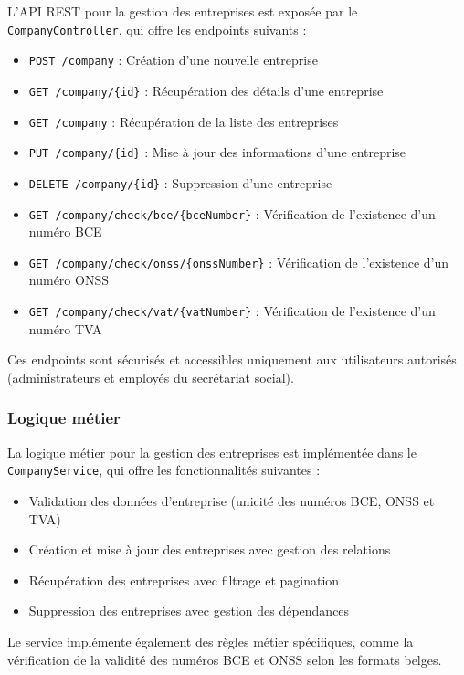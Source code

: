 \documentclass[12pt,a4paper]{report}
\begin{document}
L'API REST pour la gestion des entreprises est exposée par le \texttt{CompanyController}, qui offre les endpoints suivants :

\begin{itemize}
  \item \texttt{POST /company} : Création d'une nouvelle entreprise
  \item \texttt{GET /company/\{id\}} : Récupération des détails d'une entreprise
  \item \texttt{GET /company} : Récupération de la liste des entreprises
  \item \texttt{PUT /company/\{id\}} : Mise à jour des informations d'une entreprise
  \item \texttt{DELETE /company/\{id\}} : Suppression d'une entreprise
  \item \texttt{GET /company/check/bce/\{bceNumber\}} : Vérification de l'existence d'un numéro BCE
  \item \texttt{GET /company/check/onss/\{onssNumber\}} : Vérification de l'existence d'un numéro ONSS
  \item \texttt{GET /company/check/vat/\{vatNumber\}} : Vérification de l'existence d'un numéro TVA
\end{itemize}

Ces endpoints sont sécurisés et accessibles uniquement aux utilisateurs autorisés (administrateurs et employés du secrétariat social).

\subsubsection{Logique métier}

La logique métier pour la gestion des entreprises est implémentée dans le \texttt{CompanyService}, qui offre les fonctionnalités suivantes :

\begin{itemize}
  \item Validation des données d'entreprise (unicité des numéros BCE, ONSS et TVA)
  \item Création et mise à jour des entreprises avec gestion des relations
  \item Récupération des entreprises avec filtrage et pagination
  \item Suppression des entreprises avec gestion des dépendances
\end{itemize}

Le service implémente également des règles métier spécifiques, comme la vérification de la validité des numéros BCE et ONSS selon les formats belges.
\end{document}
